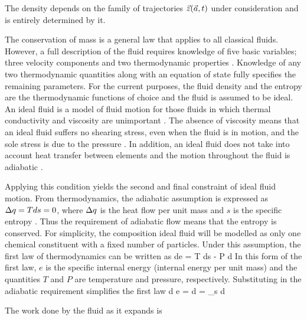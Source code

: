 The density \gr depends on the family of trajectories $\vec {z}(\vec {a},t)$ under
consideration and is entirely determined by it.

The conservation of mass is a general law that applies to all classical fluids.  However, a full
description of the fluid requires knowledge of five basic variables; three velocity components
and two thermodynamic properties .  Knowledge of any two thermodynamic quantities
along with an equation of state fully specifies the remaining parameters.  For the current
purposes, the fluid density and the entropy are the thermodynamic functions of choice and
the fluid is assumed to be ideal.  An ideal fluid is a model of fluid motion for those
fluids in which thermal conductivity and viscosity are unimportant .
The absence of viscosity means that an ideal fluid suffers no shearing stress, even
when the fluid is in motion, and the sole stress is due to the pressure .
In addition, an ideal fluid does not take into account heat transfer between elements
and the motion throughout the fluid is adiabatic .

Applying this condition yields the second and final constraint of ideal fluid motion.
From thermodynamics, the adiabatic assumption is expressed as $\Delta q = T ds = 0$, where
$\Delta q$ is the heat flow per unit mass and $s$ is the specific entropy .
Thus the requirement of adiabatic flow means that the entropy is conserved.
For simplicity, the composition ideal fluid will be modelled as only one chemical constituent
with a fixed number of particles.
Under this assumption, the first law of thermodynamics can be written as 
\bes
  de = T ds - P d  \eqp
\ees
In this form of the first law, $e$ is the specific internal energy (internal energy
per unit mass) and the quantities $T$ and $P$ are temperature and pressure, respectively.
Substituting in the adiabatic requirement simplifies the first law
\be
  d e =    d \gr = _{s} d \gr \eqp
\ee

The work done by the fluid as it expands is


